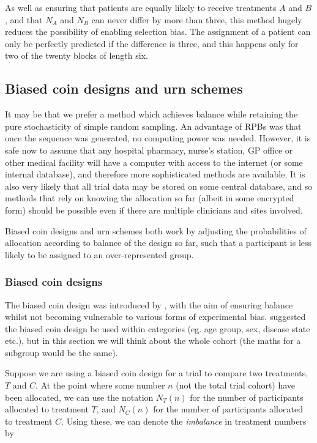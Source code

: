 \documentclass[
  openany]{book}
\theoremstyle{definition}
\theoremstyle{definition}
\theoremstyle{definition}
\theoremstyle{definition}
\theoremstyle{remark}
\begin{document}
As well as ensuring that patients are equally likely to receive treatments \(A\) and \(B\), and that \(N_A\) and \(N_B\) can never differ by more than three, this method hugely reduces the possibility of enabling selection bias. The assignment of a patient can only be perfectly predicted if the difference is three, and this happens only for two of the twenty blocks of length six.

\hypertarget{bcurn}{%
\subsection{Biased coin designs and urn schemes}\label{bcurn}}

It may be that we prefer a method which achieves balance while retaining the pure stochasticity of simple random sampling. An advantage of RPBs was that once the sequence was generated, no computing power was needed. However, it is safe now to assume that any hospital pharmacy, nurse's station, GP office or other medical facility will have a computer with access to the internet (or some internal database), and therefore more sophisticated methods are available. It is also very likely that all trial data may be stored on some central database, and so methods that rely on knowing the allocation so far (albeit in some encrypted form) should be possible even if there are multiple clinicians and sites involved.

Biased coin designs and urn schemes both work by adjusting the probabilities of allocation according to balance of the design so far, such that a participant is less likely to be assigned to an over-represented group.

\hypertarget{biased-coin-designs}{%
\subsubsection{Biased coin designs}\label{biased-coin-designs}}

The biased coin design was introduced by \citet{efron1971forcing}, with the aim of ensuring balance whilst not becoming vulnerable to various forms of experimental bias. \citet{efron1971forcing} suggested the biased coin design be used within categories (eg. age group, sex, disease state etc.), but in this section we will think about the whole cohort (the maths for a subgroup would be the same).

Suppose we are using a biased coin design for a trial to compare two treatments, \(T\) and \(C\). At the point where some number \(n\) (not the total trial cohort) have been allocated, we can use the notation \(N_T\left(n\right)\) for the number of participants allocated to treatment \(T\), and \(N_C\left(n\right)\) for the number of participants allocated to treatment \(C\). Using these, we can denote the \emph{imbalance} in treatment numbers by
\end{document}
